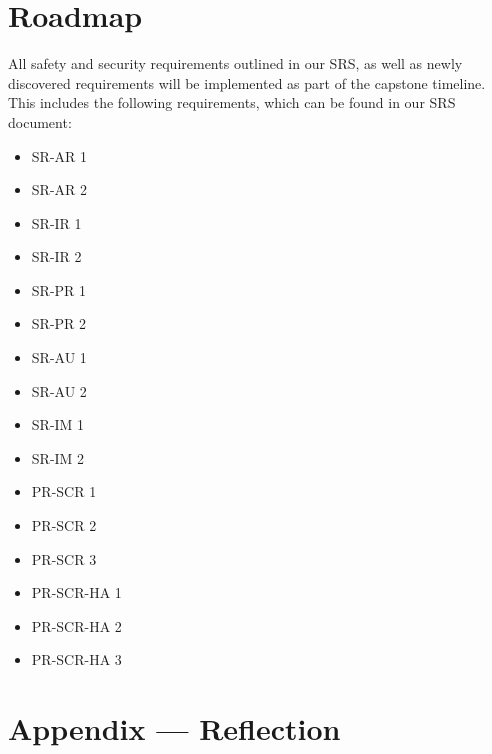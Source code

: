 \documentclass{article}
\begin{document}
\section{Roadmap}


All safety and security requirements outlined in our SRS, as well as newly discovered requirements will be implemented as part of the capstone timeline. This includes the following requirements, which can be found in our SRS document: 
\begin{multicols}{3}
\begin{itemize}
  \item SR-AR 1
  \item SR-AR 2 
  \item SR-IR 1
  \item SR-IR 2
  \item SR-PR 1
  \item SR-PR 2
  \item SR-AU 1
  \item SR-AU 2
  \item SR-IM 1
  \item SR-IM 2
  \item PR-SCR 1
  \item PR-SCR 2
  \item PR-SCR 3
  \item PR-SCR-HA 1
  \item PR-SCR-HA 2
  \item PR-SCR-HA 3
\end{itemize}
\end{multicols}
\newpage{}

\section*{Appendix --- Reflection}

\end{document}
